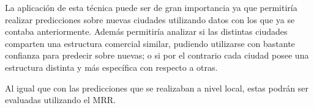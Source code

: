 La aplicación de esta técnica puede ser de gran importancia ya que permitiría realizar predicciones sobre nuevas ciudades utilizando datos con los que ya se contaba anteriormente. Además permitiría analizar si las distintas ciudades comparten una estructura comercial similar, pudiendo utilizarse con bastante confianza para predecir sobre nuevas; o si por el contrario cada ciudad posee una estructura distinta y más específica con respecto a otras.

Al igual que con las predicciones que se realizaban a nivel local, estas podrán ser evaluadas utilizando el MRR.
	













